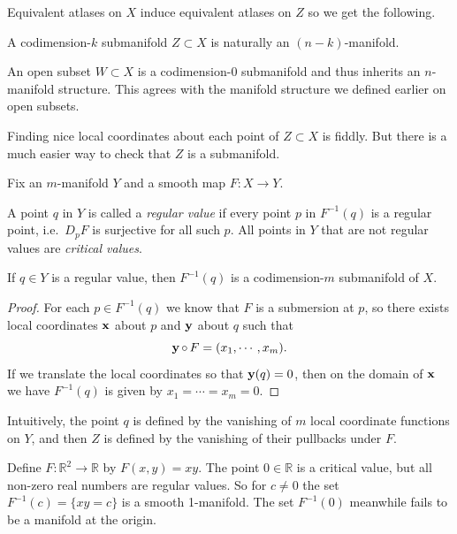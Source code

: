 \documentclass[a4paper,11pt]{article}
\begin{document}
	Equivalent atlases on $X$ induce equivalent atlases on $Z$ so we get the following.

	\begin{prop}
		A codimension-$k$ submanifold $Z \subset X$ is naturally an $(n-k)$-manifold.
	\end{prop}

	\begin{ex}
		An open subset $W \subset X$ is a codimension-0 submanifold and thus inherits an $n$-manifold structure. This agrees with the manifold structure we defined earlier on open subsets.
	\end{ex}

	Finding nice local coordinates about each point of $Z \subset X$ is fiddly. But there is a much easier way to check that $Z$ is a submanifold.

	Fix an $m$-manifold $Y$ and a smooth map $F: X \to Y$.

	\begin{defi}
		A point $q$ in $Y$ is called a \emph{regular value} if every point $p$ in $F^{-1}(q)$ is a regular point, i.e.\ $D_p F$ is surjective for all such $p$. All points in $Y$ that are not regular values are \emph{critical values}.
	\end{defi}

	\begin{prop}
		If $q \in Y$ is a regular value, then $F^{-1}(q)$ is a codimension-$m$ submanifold of $X$.
	\end{prop}
	\begin{proof}
		For each $p \in F^{-1}(q)$ we know that $F$ is a submersion at $p$, so there exists local coordinates $\vb x$ about $p$ and $\vb y$ about $q$ such that
		\[
			\vb y \operatorname{\circ} F = (x_1, \cdots, x_m).
		\]
		If we translate the local coordinates so that $\vb y(q) = 0$, then on the domain of $\vb x$ we have $F^{-1}(q)$ is given by $x_1 = \cdots = x_m = 0$.
	\end{proof}

	Intuitively, the point $q$ is defined by the vanishing of $m$ local coordinate functions on $Y$, and then $Z$ is defined by the vanishing of their pullbacks under $F$.

	\begin{ex}
		Define $F : \mathbb{R}^2 \to \mathbb{R}$ by $F(x,y) = xy$. The point $0\in \mathbb{R}$ is a critical value, but all non-zero real numbers are regular values. So for $c\neq 0$ the set $F^{-1}(c) = \{xy = c\}$ is a smooth 1-manifold. The set $F^{-1}(0)$ meanwhile fails to be a manifold at the origin.
		
	\end{ex}
\end{document}
